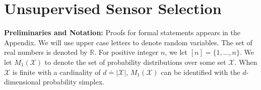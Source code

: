\documentclass[11pt]{article} %
\newcommand{\todoc}[2][]{\todo[color=Apricot!20,size=\tiny,#1]{Cs: #2}}
\newcommand{\R}{\mathbb{R}} %
\newcommand{\X}{\mathcal{X}}
\begin{document}
\section{Unsupervised Sensor Selection}
\label{sec:Setup}
%
\newcommand{\ind}[1]{\mathbb{I}\{#1\}}
%
\vspace{-5pt}
\noindent
{\bf Preliminaries and Notation:} Proofs for formal statements appears in the Appendix. We will use upper case letters to denote random variables.
The set of real numbers is denoted by $\R$. For positive integer $n$, we let
$[n] = \{1,\dots,n\}$. %
We let $M_1(\X)$ to denote the set of probability distributions over some set $\X$.
When $\X$ is finite with a cardinality of $d \doteq |\X|$, 
$M_1(\X)$ can be identified with the $d$-dimensional probability simplex.
\end{document}
